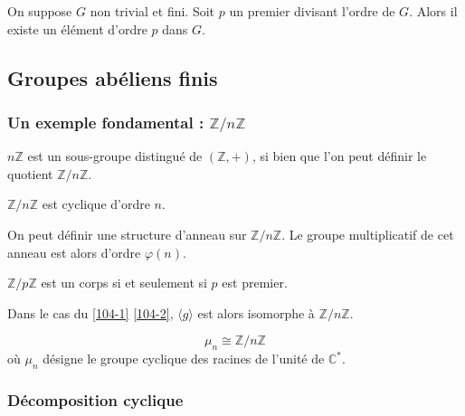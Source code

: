 	\begin{application}
		On suppose $G$ non trivial et fini. Soit $p$ un premier divisant l'ordre de $G$. Alors il existe un élément d'ordre $p$ dans $G$.
	\end{application}

	\newpage
	\subsection{Groupes abéliens finis}

	\subsubsection{Un exemple fondamental : \texorpdfstring{$\mathbb{Z}/n\mathbb{Z}$}{Z/nZ}}


	\begin{proposition}
		$n\mathbb{Z}$ est un sous-groupe distingué de $(\mathbb{Z}, +)$, si bien que l'on peut définir le quotient $\mathbb{Z}/n\mathbb{Z}$.
	\end{proposition}

	\begin{proposition}
		$\mathbb{Z}/n\mathbb{Z}$ est cyclique d'ordre $n$.
	\end{proposition}

	\begin{proposition}
		On peut définir une structure d'anneau sur $\mathbb{Z}/n\mathbb{Z}$. Le groupe multiplicatif de cet anneau est alors d'ordre $\varphi(n)$.
	\end{proposition}

	\begin{corollary}
		$\mathbb{Z}/p\mathbb{Z}$ est un corps si et seulement si $p$ est premier.
	\end{corollary}


	\begin{proposition}
		Dans le cas du \cref{104-1} \cref{104-2}, $\langle g \rangle$ est alors isomorphe à $\mathbb{Z}/n\mathbb{Z}$.
	\end{proposition}

	\begin{example}
		\[ \mu_n \cong \mathbb{Z}/n\mathbb{Z} \]
		où $\mu_n$ désigne le groupe cyclique des racines de l'unité de $\mathbb{C}^*$.
	\end{example}

	\subsubsection{Décomposition cyclique}

